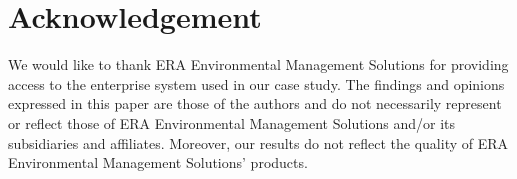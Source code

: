 \documentclass[smallextended]{svjour3}
\begin{document}




 



\section*{Acknowledgement}
We would like to thank ERA Environmental Management Solutions
for providing access to the enterprise system used in our case study.
The findings and opinions expressed in this paper are those of the
authors and do not necessarily represent or reflect those of ERA
Environmental Management Solutions and/or its subsidiaries and
affiliates. Moreover, our results do not reflect the quality of ERA
Environmental Management Solutions’ products.






\end{document}
